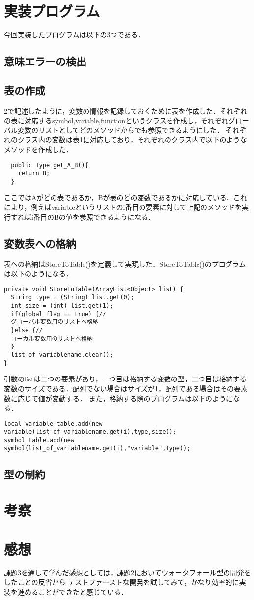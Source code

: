 \documentclass[dvipdfmx]{jarticle}
\begin{document}
\section{実装プログラム}
今回実装したプログラムは以下の3つである．
\subsection{意味エラーの検出}
\subsection{表の作成}
2で記述したように，変数の情報を記録しておくために表を作成した．それぞれの表に対応するsymbol,variable,functionというクラスを作成し，それぞれグローバル変数のリストとしてどのメソッドからでも参照できるようにした．
それぞれのクラス内の変数は表1に対応しており，それぞれのクラス内で以下のようなメソッドを作成した．
\begin{lstlisting}
  public Type get_A_B(){
    return B;
  }
\end{lstlisting}
ここではAがどの表であるか，Bが表のどの変数であるかに対応している．これにより，例えばvariableというリストのi番目の要素に対して上記のメソッドを実行すればi番目のBの値を参照できるようになる．
\subsection{変数表への格納}
表への格納はStoreToTable()を定義して実現した．StoreToTable()のプログラムは以下のようになる．
\begin{lstlisting}
private void StoreToTable(ArrayList<Object> list) {
  String type = (String) list.get(0);
  int size = (int) list.get(1);
  if(global_flag == true) {//
  グローバル変数用のリストへ格納
  }else {//
  ローカル変数用のリストへ格納
  }
  list_of_variablename.clear();
}
\end{lstlisting}
引数のlistは二つの要素があり，一つ目は格納する変数の型，二つ目は格納する変数のサイズである．配列でない場合はサイズが1，配列である場合はその要素数に応じて値が変動する．
また，格納する際のプログラムは以下のようになる．
\begin{lstlisting}
local_variable_table.add(new variable(list_of_variablename.get(i),type,size));
symbol_table.add(new symbol(list_of_variablename.get(i),"variable",type));
\end{lstlisting}
\subsection{型の制約}
\section{考察}
\section{感想}
課題3を通して学んだ感想としては，課題2においてウォータフォール型の開発をしたことの反省から
テストファーストな開発を試してみて，かなり効率的に実装を進めることができたと感じている．
\begin{thebibliography}{1}
\end{thebibliography}
\end{document}
